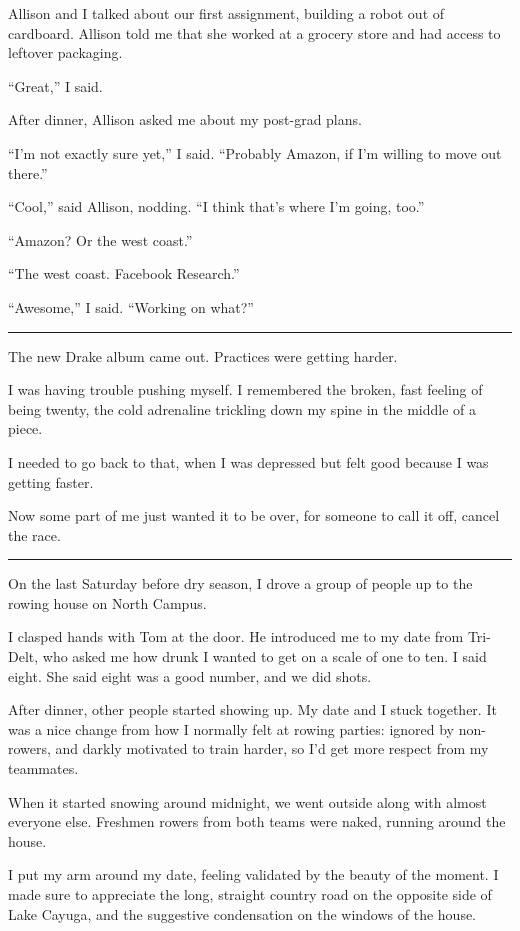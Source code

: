 Allison and I talked about our first assignment, building a robot out of
cardboard.  Allison told me that she worked at a grocery store and had access to
leftover packaging.

``Great,'' I said.

After dinner, Allison asked me about my post-grad plans.

``I'm not exactly sure yet,'' I said.  ``Probably Amazon, if I'm willing to move
out there.''

``Cool,'' said Allison, nodding.  ``I think that's where I'm going, too.''

``Amazon?  Or the west coast.''

``The west coast.  Facebook Research.''

``Awesome,'' I said.  ``Working on what?''

\plainfancybreak{12pt}{2}{}

The new Drake album came out. Practices were getting harder.

I was having trouble pushing myself.  I remembered the broken, fast feeling of
being twenty, the cold adrenaline trickling down my spine in the middle of a
piece.

I needed to go back to that, when I was depressed but felt good because I was
getting faster.

Now some part of me just wanted it to be over, for someone to call it off,
cancel the race.

\plainfancybreak{12pt}{2}{}

On the last Saturday before dry season, I drove a group of people up to the
rowing house on North Campus.

I clasped hands with Tom at the door.  He introduced me to my date from
Tri-Delt, who asked me how drunk I wanted to get on a scale of one to ten. I
said eight.  She said eight was a good number, and we did shots.

After dinner, other people started showing up.  My date and I stuck together.
It was a nice change from how I normally felt at rowing parties: ignored by
non-rowers, and darkly motivated to train harder, so I'd get more respect from
my teammates.

When it started snowing around midnight, we went outside along with almost
everyone else.  Freshmen rowers from both teams were naked, running around the
house.

I put my arm around my date, feeling validated by the beauty of the moment.  I
made sure to appreciate the long, straight country road on the opposite side of
Lake Cayuga, and the suggestive condensation on the windows of the house.

